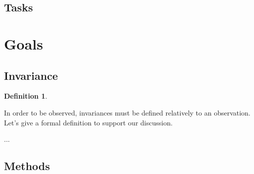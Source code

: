 \documentclass{article}
\newtheorem{definition}{Definition}
\begin{document}
\subsection{Tasks} %
\label{tasks}









\section{Goals}

\subsection{Invariance}

\begin{definition}

\end{definition}

In order to be observed, invariances must be defined relatively to an observation. Let's give a formal definition to support our discussion.

...

\subsection{Methods}
\label{methods}
\end{document}
